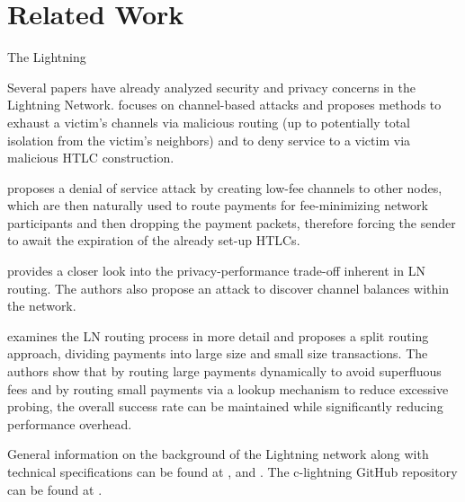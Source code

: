 \section{Related Work}
\label{sec:related_work}

The Lightning

\noindent
Several papers have already analyzed security and privacy concerns in the Lightning Network. \cite{rohrer2019discharged} focuses on channel-based attacks and proposes methods to exhaust a victim's channels via malicious routing (up to potentially total isolation from the victim's neighbors) and to deny service to a victim via malicious HTLC construction. \newline

\noindent
\cite{tochner2019hijacking} proposes a denial of service attack by creating low-fee channels to other nodes, which are then naturally used to route payments for fee-minimizing network participants and then dropping the payment packets, therefore forcing the sender to await the expiration of the already set-up HTLCs. \newline

\noindent
\cite{balancehiding} provides a closer look into the privacy-performance trade-off inherent in LN routing. The authors also propose an attack to discover channel balances within the network. \newline

\noindent
\cite{wang2019flash} examines the LN routing process in more detail and proposes a split routing approach, dividing payments into large size and small size transactions. The authors show that by routing large payments dynamically to avoid superfluous fees and by routing small payments via a lookup mechanism to reduce excessive probing, the overall success rate can be maintained while significantly reducing performance overhead. \newline

\noindent
General information on the background of the Lightning network along with technical specifications can be found at \cite{ln_whitepaper}, \cite{lightningrfc} and \cite{lnbook}. The c-lightning GitHub repository can be found at \cite{clightninggit}.